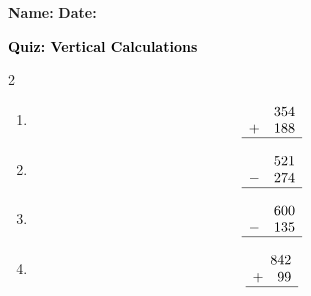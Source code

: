 \documentclass[12pt, letterpaper, fleqn]{article}
\begin{document}
\textbf{Name:} \underline{\hspace{5cm}}
\hfill
\textbf{Date:} \underline{\hspace{3cm}}\\

\begin{tcolorbox}[colback=customteal!20]
    \large\textcolor{black}{\textbf{Quiz: Vertical Calculations}}
\end{tcolorbox}

\vspace{5mm}
\begin{multicols}{2}
\begin{enumerate}[itemsep=3cm, leftmargin=0.6cm]
\item 
\[
\begin{array}{r}
  354 \\
  +\quad 188 \\
  \hline
\end{array}
\]

\item 
\[
\begin{array}{r}
  521 \\
  -\quad 274 \\
  \hline
\end{array}
\]

\item 
\[
\begin{array}{r}
  600 \\
  -\quad 135 \\
  \hline
\end{array}
\]

\item 
\[
\begin{array}{r}
  842 \\
  +\quad 99 \\
  \hline
\end{array}
\]
\end{enumerate}
\end{multicols}
\end{document}
